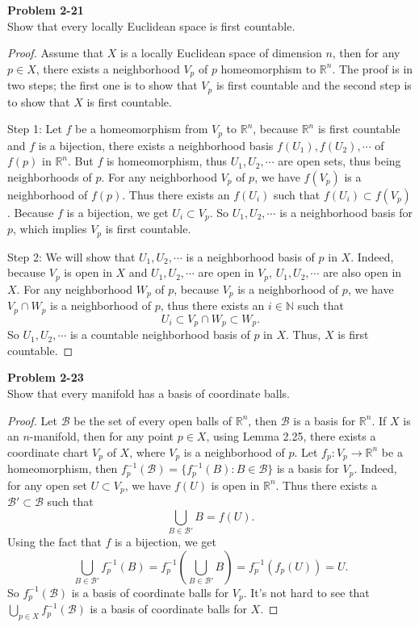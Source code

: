 \documentclass[12pt, a4paper]{article}
\theoremstyle{plain}
\newcommand{\N}{\mathbb{N}}
\newcommand{\B}{\mathscr{B}}
\newcommand{\R}{\mathbb{R}}
\newenvironment{problem}[2][Problem]
    { \begin{mdframed}[backgroundcolor=gray!20] \textbf{#1 #2} \\}
    {  \end{mdframed}}
\begin{document}
\begin{problem}{2-21}
Show that every locally Euclidean space is first countable.
\end{problem}
	\begin{proof}
	Assume that $X$ is a locally Euclidean space of dimension $n$, then for any $p\in X$, there exists a neighborhood $V_p$ of $p$ homeomorphism to $\R^n$. The proof is in two steps; the first one is to show that $V_p$ is first countable and the second step is to show that $X$ is first countable. 
	
	Step 1: Let $f$ be a homeomorphism from $V_p$ to $\R^n$, because $\R^n$ is first countable and $f$ is a bijection, there exists a neighborhood basis $f(U_1),f(U_2),\cdots$ of $f(p)$ in $\R^n$. But $f$ is homeomorphism, thus $U_1, U_2,\cdots$ are open sets, thus being neighborhoods of $p$. For any neighborhood $V_p$ of $p$, we have $f(V_p)$ is a neighborhood of $f(p)$. Thus there exists an $f(U_i)$ such that $f(U_i)\subset f(V_p)$. Because $f$ is a bijection, we get $U_i\subset V_p$. So $U_1,U_2,\cdots$ is a neighborhood basis for $p$, which implies $V_p$ is first countable.
	
	Step 2: We will show that $U_1,U_2,\cdots$ is a neighborhood basis of $p$ in $X$. Indeed, because $V_p$ is open in $X$ and $U_1,U_2,\cdots$ are open in $V_p$, $U_1,U_2,\cdots$ are also open in $X$. For any neighborhood $W_p$ of $p$, because $V_p$ is a neighborhood of $p$, we have $V_p\cap W_p$ is a neighborhood of $p$, thus there exists an $i\in \N$ such that 
	\[
	U_i\subset V_p\cap W_p\subset W_p.
	\]
	So $U_1,U_2,\cdots$ is a countable neighborhood basis of $p$ in $X$. Thus, $X$ is first countable.
	\end{proof}

\begin{problem}{2-23}
Show that every manifold has a basis of coordinate balls.
\end{problem}
	\begin{proof}
	Let $\B$ be the set of every open balls of $\R^n$, then $\B$ is a basis for $\R^n$. If $X$ is an $n$-manifold, then for any point $p\in X$, using Lemma 2.25, there exists a coordinate chart $V_p$ of $X$, where $V_p$ is a neighborhood of $p$. Let $f_p:V_p\rightarrow \R^n$ be a homeomorphism, then $f_p^{-1}(\B)=\{f_p^{-1}(B):B\in\B\}$ is a basis for $V_p$. Indeed, for any open set $U\subset V_p$, we have $f(U)$ is open in $\R^n$. Thus there exists a $\B'\subset\B$ such that 
	\[
	\bigcup_{B\in\B'}B=f(U).
	\]  
	Using the fact that $f$ is a bijection, we get 
	\[
	\bigcup_{B\in\B'}f_p^{-1}(B)=f_p^{-1}(\bigcup_{B\in\B'}B)=f_p^{-1}(f_p(U))=U.
	\]
	So $f_p^{-1}(\B)$ is a basis of coordinate balls for $V_p$. It's not hard to see that $\bigcup_{p\in X}f_p^{-1}(\B)$ is a basis of coordinate balls for $X$.
	\end{proof}
\end{document}
